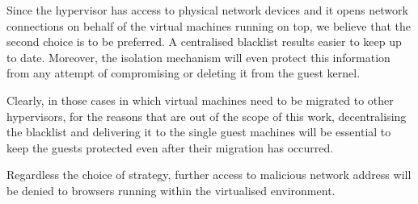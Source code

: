 Since the hypervisor has access to physical network devices and it opens network connections on behalf of the virtual machines running on top, we believe that the second choice is to be preferred. 
A centralised blacklist results easier to keep up to date. Moreover, the isolation mechanism will even protect this information from any attempt of compromising or deleting it from the guest kernel.
 
Clearly, in those cases in which virtual machines need to be migrated to other hypervisors, for the reasons that are out of the scope of this work, decentralising the blacklist and delivering it to the single guest machines will be essential to keep the guests protected even after their migration has occurred.

Regardless the choice of strategy, further access to malicious network address will be denied to browsers running within the virtualised environment.



%



%



